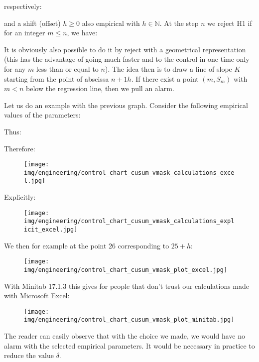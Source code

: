 	respectively:
	
	and a shift (offset) $h\geq 0$ also empirical with $h\in \mathbb{N}$. At the step $n$ we reject H1 if for an integer $m\leq n$, we have:
	
	It is obviously also possible to do it by reject with a geometrical representation (this has the advantage of going much faster and to the control in one time only for any $m$ less than or equal to $n$). The idea then is to draw a line of slope $K$ starting from the point of abscissa $n+1h$. If there exist a point $(m,S_m)$ with $m<n$ below the regression line, then we pull an alarm.
	
	Let us do an example with the previous graph. Consider the following empirical values of the parameters:
	
	Thus:
	
	Therefore:
	\begin{figure}[H]
		\centering
		\texttt{[image: img/engineering/control\_chart\_cusum\_vmask\_calculations\_excel.jpg]}
	\end{figure}
	Explicitly:
	\begin{figure}[H]
		\centering
		\texttt{[image: img/engineering/control\_chart\_cusum\_vmask\_calculations\_explicit\_excel.jpg]}
	\end{figure}
	We then for example at the point $26$ corresponding to $25 + h$:
	\begin{figure}[H]
		\centering
		\texttt{[image: img/engineering/control\_chart\_cusum\_vmask\_plot\_excel.jpg]}
	\end{figure}
	With Minitab 17.1.3 this gives for people that don't trust our calculations made with Microsoft Excel:
	\begin{figure}[H]
		\centering
		\texttt{[image: img/engineering/control\_chart\_cusum\_vmask\_plot\_minitab.jpg]}
	\end{figure}
	The reader can easily observe that with the choice we made, we would have no alarm with the selected empirical parameters. It would be necessary in practice to reduce the value $\delta$.

